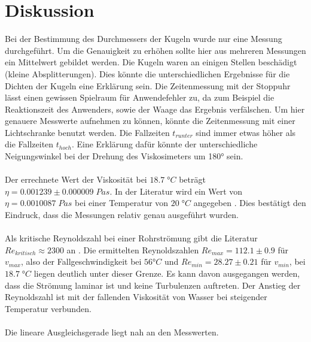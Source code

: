 \section{Diskussion}
\label{sec:Diskussion}
Bei der Bestimmung des Durchmessers der Kugeln wurde nur eine Messung durchgeführt. Um die Genauigkeit zu erhöhen sollte hier aus mehreren Messungen ein Mittelwert 
gebildet werden. Die Kugeln waren an einigen Stellen beschädigt (kleine Absplitterungen). Dies könnte die unterschiedlichen Ergebnisse für die Dichten der Kugeln eine Erklärung sein.
Die Zeitenmessung mit der Stoppuhr lässt einen gewissen Spielraum für Anwendefehler zu, da zum Beispiel die Reaktionszeit des Anwenders, sowie der Waage das Ergebnis verfälschen.
Um hier genauere Messwerte aufnehmen zu können, könnte die Zeitenmessung mit einer Lichtschranke benutzt werden. 
Die Fallzeiten $t_{runter}$ sind immer etwas höher als die Fallzeiten $t_{hoch}$. Eine Erklärung dafür könnte der unterschiedliche Neigungswinkel bei der Drehung des 
Viskosimeters um 180° sein.
\\
\\
Der errechnete Wert der Viskosität bei $18.7\;\unit{°C}$ beträgt $\eta = 0.001239\pm0.000009\;\unit{Pa s}$. In der Literatur wird ein Wert von $\eta = 0.0010087\;\unit{Pa s}$ bei einer
Temperatur von $20\;\unit{°C}$ angegeben \cite{viskosität_wasser}. Dies bestätigt den Eindruck, dass die Messungen relativ genau ausgeführt wurden. 
\\
\\
Als kritische Reynoldszahl bei einer Rohrströmung gibt die Literatur $Re_{kritisch} \approx 2300$ an \cite{reynold_kritisch}. Die ermittelten Reynoldszahlen $Re_{max} = 112.1 \pm 0.9$ für $v_{max}$, also der Fallgeschwindigkeit
bei $56\unit{°C}$ und $Re_{min} = 28.27 \pm 0.21$ für $v_{min}$, bei $18.7\;\unit{°C}$ liegen deutlich unter dieser Grenze. Es kann davon ausgegangen werden, dass die Strömung laminar ist und keine 
Turbulenzen auftreten.
Der Anstieg der Reynoldszahl ist mit der fallenden Viskosität von Wasser bei steigender Temperatur verbunden. 
\\
\\
Die lineare Ausgleichsgerade liegt nah an den Messwerten. 





\newpage